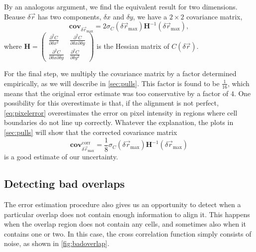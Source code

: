 \documentclass{article}
\newcommand{\matrixbold}[1]{\mathbf{#1}}
\begin{document}
By an analogous argument, we find the equivalent result for two dimensions.  Beause $\delta\vec{r}$ has two components, $\delta x$ and $\delta y$, we have a $2\times2$ covariance matrix,
\begin{equation}
\matrixbold{cov}_{\delta\vec{r}_\text{max}}=2\sigma_C(\delta\vec{r}_\text{max})\matrixbold{H}^{-1}(\delta\vec{r}_\text{max}),
\label{eq:overlapcovariance}
\end{equation}
where $ %
\matrixbold{H}=\begin{pmatrix}
\frac{\partial^2C}{\partial \delta x^2} & \frac{\partial^2C}{\partial \delta x \partial \delta y} \\
\frac{\partial^2C}{\partial \delta x \partial \delta y} & \frac{\partial^2C}{\partial \delta y^2}
\end{pmatrix}
$ %
is the Hessian matrix of $C(\delta\vec{r})$.

For the final step, we multiply the covariance matrix by a factor determined empirically, as we will describe in \cref{sec:pulls}.  This factor is found to be $\frac{1}{16}$, which means that the original error estimate was too conservative by a factor of $4$.  One possibility for this overestimate is that, if the alignment is not perfect, \cref{eq:pixelerror} overestimates the error on pixel intensity in regions where cell boundaries do not line up correctly.  Whatever the explanation, the plots in \cref{sec:pulls} will show that the corrected covariance matrix
\begin{equation}
\matrixbold{cov}_{\delta\vec{r}_\text{max}}^\text{corr}=\frac{1}{8}\sigma_C(\delta\vec{r}_\text{max})\matrixbold{H}^{-1}(\delta\vec{r}_\text{max})
\label{eq:overlapcovariancecorrected}
\end{equation}
is a good estimate of our uncertainty.

\subsection{Detecting bad overlaps}
\label{sec:badoverlaps}

The error estimation procedure also gives us an opportunity to detect when a particular overlap does not contain enough information to align it.  This happens when the overlap region does not contain any cells, and sometimes also when it contains one or two.  In this case, the cross correlation function simply consists of noise, as shown in \cref{fig:badoverlap}.
\end{document}
